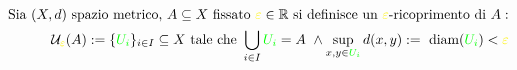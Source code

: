 \documentclass[preview]{standalone}
\begin{document}
\begin{align*}
\text{Sia } ( X , d) \text{ spazio metrico, } A \subseteq  X  \text{ fissato } \textcolor{yellow}{\varepsilon} \in \mathbb{R} \text{ si definisce un } \textcolor{yellow}{\varepsilon}\text{-ricoprimento di } A: \\ \mathcal{U}_{\textcolor{yellow}{\varepsilon}}(A) :=  \{\textcolor{green}{U_i}\}_{i \in I} \subseteq  X  \text{ tale che } \bigcup_{i \in I} \textcolor{green}{U_i} = A  \ \land \sup_{x,y \in \textcolor{green}{U_i}} d(x,y) := \text{ diam}(\textcolor{green}{U_i}) < \textcolor{yellow}{\varepsilon}
\end{align*}
\end{document}
